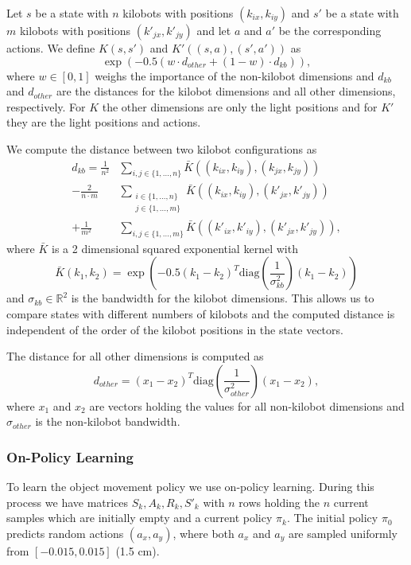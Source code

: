 \documentclass[twoside]{article}
\begin{document}
Let $s$ be a state with $n$ kilobots with positions $(k_{ix}, k_{iy})$
and $s'$ be a state with $m$ kilobots with positions $(k'_{jx}, k'_{jy})$ and
let $a$ and $a'$ be the corresponding actions.
We define $K(s, s')$ and $K'((s, a), (s', a'))$ as
$$
\exp(-0.5 (w \cdot d_{other} + (1 - w) \cdot d_{kb})),
$$
where $w \in [0,1]$ weighs the importance of the non-kilobot dimensions and
$d_{kb}$ and $d_{other}$ are the distances for the kilobot dimensions and all other
dimensions, respectively. For $K$ the other dimensions are only the light
positions and for $K'$ they are the light positions and actions.

We compute the distance between two kilobot configurations as
\begin{align*}
d_{kb} =
  \frac{1}{n^2} &\sum_{i,j \in \{1,\dots,n\}}
    \bar{K}((k_{ix}, k_{iy}), (k_{jx}, k_{jy})) \\
- \frac{2}{n \cdot m} &\sum_{\substack{i \in \{1,\dots,n\}\\j \in \{1,\dots,m\}}}
    \bar{K}((k_{ix}, k_{iy}), (k'_{jx}, k'_{jy})) \\
+ \frac{1}{m^2} &\sum_{i,j \in \{1,\dots,m\}}
    \bar{K}((k'_{ix}, k'_{iy}), (k'_{jx}, k'_{jy})),
\end{align*}
where $\bar{K}$ is a 2 dimensional squared exponential kernel with
$$
\bar{K}(k_1, k_2) =
    \exp \left(-0.5 (k_1 - k_2)^T
    \mathrm{diag}\left(\frac{1}{\sigma_{kb}^2}\right) (k_1 - k_2)\right)
$$
and $\sigma_{kb} \in \mathbb{R}^2$ is the bandwidth for the kilobot dimensions.
This allows us to compare states with different numbers of kilobots and the
computed distance is independent of the order of the kilobot positions in the
state vectors.

The distance for all other dimensions is computed as
$$
d_{other} = (x_1 - x_2)^T \mathrm{diag}\left(\frac{1}{\sigma_{other}^2}\right) (x_1 - x_2),
$$
where $x_1$ and $x_2$ are vectors holding the values for all non-kilobot
dimensions and $\sigma_{other}$ is the non-kilobot bandwidth.

\subsubsection{On-Policy Learning}

To learn the object movement policy we use on-policy learning. During this
process we have matrices $S_k, A_k, R_k, S'_k$ with $n$ rows holding the $n$
current samples which are initially empty and a current policy $\pi_k$. The
initial policy $\pi_0$ predicts random actions $(a_x, a_y)$, where both $a_x$ and
$a_y$ are sampled uniformly from $[-0.015, 0.015]$ (1.5 cm).
\end{document}
